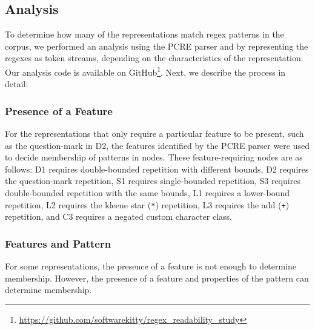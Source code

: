 





\subsection{Analysis}
\label{communityanalysis}
To determine how many of the representations match regex patterns in the corpus, we performed an analysis using the PCRE parser and by representing the regexes as token streams, depending on the characteristics of the representation. Our analysis code is available on GitHub\footnote{\url{https://github.com/softwarekitty/regex_readability_study}}. Next, we describe the process in detail: 

\subsubsection{Presence of a Feature}
For the representations that only require a particular feature to be present, such as the question-mark in D2, the features identified by the PCRE parser were used to decide membership of patterns in nodes.  
These feature-requiring nodes are as follows: D1 requires double-bounded repetition with different bounds, D2 requires the question-mark repetition, S1 requires single-bounded repetition, S3 requires double-bounded repetition with the same bounds,  L1 requires a lower-bound repetition, L2 requires the kleene star (\verb!*!) repetition, L3 requires the add (\verb!+!) repetition, and C3 requires a negated custom character class.


\subsubsection{Features  and Pattern}
For some representations, the presence of a feature is not enough to determine membership. 
However,  the presence of a feature and properties of the pattern can determine membership.  


